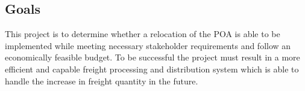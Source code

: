 \subsection*{Goals}
This project is to determine whether a relocation of the POA is able to be implemented while meeting necessary stakeholder requirements and follow an economically feasible budget. To be successful the project must result in a more efficient and capable freight processing and distribution system which is able to handle the increase in freight quantity in the future.

\clearpage
